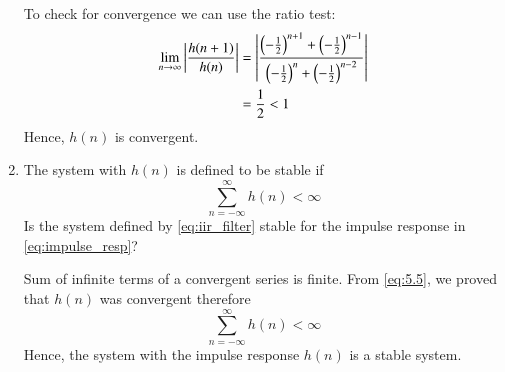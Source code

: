 \documentclass[journal,12pt,twocolumn]{IEEEtran}
\theoremstyle{remark}
\renewcommand\thesection{\arabic{section}}
\numberwithin{equation}{subsection}
\begin{document}
\begin{enumerate}[label=\thesection.\arabic*]
To check for convergence we can use the ratio test:
\begin{align}
    \lim_{n \to \infty}\left\vert\frac{h(n + 1)}{h(n)}\right\vert &= \left\vert\frac{\left(-\frac{1}{2}\right)^{n+1} + \left(-\frac{1}{2}\right)^{n-1}}{\left(-\frac{1}{2}\right)^{n} + \left(-\frac{1}{2}\right)^{n-2}}\right\vert\\
    &= \frac{1}{2} < 1 \label{eq:5.5}
\end{align}
Hence, $h(n)$ is convergent.

\item The system with $h(n)$ is defined to be stable if
\begin{equation}
\sum_{n=-\infty}^{\infty}h(n) < \infty \label{eq:5.6}
\end{equation}
Is the system defined by \eqref{eq:iir_filter} stable for the impulse response in \eqref{eq:impulse_resp}?

\solution Sum of infinite terms of a convergent series is finite. From \eqref{eq:5.5}, we proved that $h(n)$ was convergent therefore
\begin{equation}
\sum_{n=-\infty}^{\infty}h(n) < \infty
\end{equation}
Hence, the system with the impulse response $h(n)$ is a stable system.


\end{enumerate}
\end{document}
